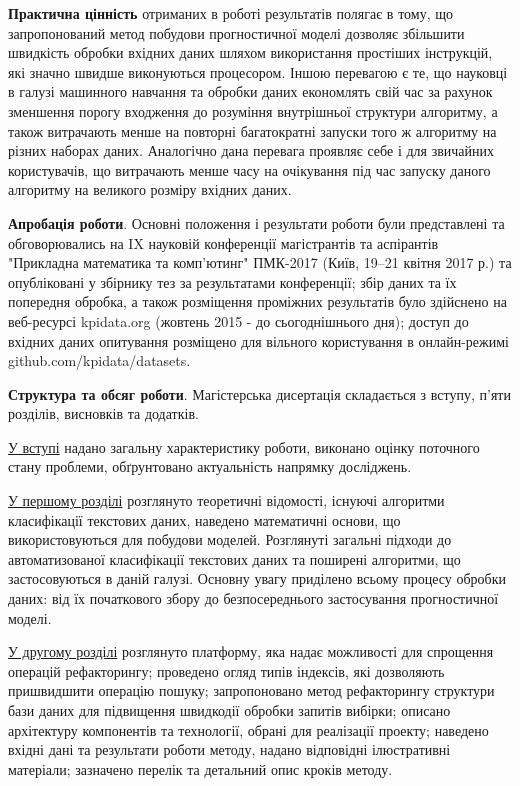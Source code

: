 \documentclass[a4paper,14pt]{extarticle}
\begin{document}
\textbf{Практична цінність} отриманих в роботі результатів полягає в тому,
що запропонований метод побудови прогностичної моделі дозволяє збільшити швидкість обробки вхідних даних шляхом використання простіших інструкцій, які значно швидше виконуються процесором. Іншою перевагою є те, що науковці в галузі машинного навчання та обробки даних економлять свій час за рахунок зменшення порогу входження до розуміння внутрішньої структури алгоритму, а також витрачають менше на повторні багатократні запуски того ж алгоритму на різних наборах даних. Аналогічно дана перевага проявляє себе і для звичайних користувачів, що витрачають менше часу на очікування під час запуску даного алгоритму на великого розміру вхідних даних.

\textbf{Апробація роботи}. Основні положення і результати роботи були представлені та обговорювались на IX науковій конференції магістрантів та аспірантів "Прикладна математика та комп’ютинг" ПМК-2017 (Київ,
19–21 квітня 2017 р.) та опубліковані у збірнику тез за результатами конференції; збір даних та їх попередня обробка, а також розміщення проміжних результатів було здійснено на веб-ресурсі kpidata.org (жовтень 2015 - до сьогоднішнього дня); доступ до вхідних даних опитування розміщено для вільного користування в онлайн-режимі github.com/kpidata/datasets.

\textbf{Структура та обсяг роботи}. Магістерська дисертація складається з вступу, п'яти розділів, висновків та додатків.

\underline{У вступі} надано загальну характеристику роботи, виконано оцінку поточного стану проблеми, обґрунтовано актуальність напрямку досліджень.

\underline{У першому розділі} розглянуто теоретичні відомості, існуючі алгоритми класифікації текстових даних, наведено математичні основи, що використовуються для побудови моделей. Розглянуті загальні підходи до автоматизованої класифікації текстових даних та поширені алгоритми, що застосовуються в даній галузі. Основну увагу приділено всьому процесу обробки даних: від їх початкового збору до безпосереднього застосування прогностичної моделі.

\underline{У другому розділі} розглянуто платформу, яка надає можливості для спрощення операцій рефакторингу; проведено огляд типів індексів, які дозволяють пришвидшити операцію пошуку; запропоновано метод рефакторингу структури бази даних для підвищення швидкодії обробки запитів вибірки; описано архітектуру компонентів та технології, обрані для реалізації проекту; наведено вхідні дані та результати роботи методу, надано відповідні ілюстративні матеріали; зазначено перелік та детальний опис кроків методу.
\end{document}
